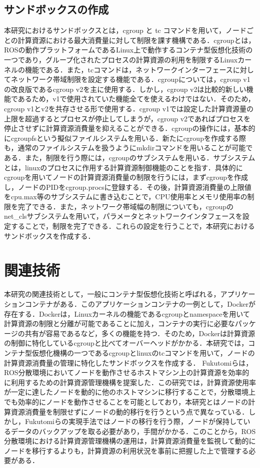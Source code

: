 \documentclass[11pt]{ujarticle} %
\begin{document}
\subsection{サンドボックスの作成}
本研究におけるサンドボックスとは，cgroup と tc コマンドを用いて，ノードごとの計算資源における最大消費量に対して制限を課す機構である．cgroupとは，ROSの動作プラットフォームであるLinux上で動作するコンテナ型仮想化技術の一つであり，グループ化されたプロセスの計算資源の利用を制限するLinuxカーネルの機能である．また，tcコマンドは，ネットワークインターフェースに対してネットワーク帯域制限を設定する機能である．cgroupについては，cgroup v1の改良版であるcgroup v2を主に使用する．しかし，cgroup v2は比較的新しい機能であるため，v1で使用されていた機能全てを使えるわけではない．そのため，cgroup v1とv2を共存させる形で使用する．cgroup v1では設定した計算資源量の上限を超過するとプロセスが停止してしまうが，cgroup v2であればプロセスを停止させずに計算資源消費量を抑えることができる．cgroupの操作には，基本的にcgroupfsという擬似ファイルシステムを用いる．新たにcgroupを作成する際も，通常のファイルシステムを扱うようにmkdirコマンドを用いることが可能である．また，制限を行う際には，cgroupのサブシステムを用いる．サブシステムとは，linuxのプロセスに作用する計算資源制御機能のことを指す．具体的にcgroupを用いてノードの計算資源消費量の制限を行うには，まずcgroupを作成し，ノードのPIDをcgroup.procsに登録する．その後，計算資源消費量の上限値をcpu.max等のサブシステムに書き込むことで，CPU使用率とメモリ使用率の制限を完了できる．また，ネットワーク帯域幅の制限についても，cgroupのnet\_clsサブシステムを用いて，パラメータとネットワークインタフェースを設定することで，制限を完了できる．これらの設定を行うことで，本研究におけるサンドボックスを作成する．

\section{関連技術}
本研究の関連技術として，一般にコンテナ型仮想化技術と呼ばれる，アプリケーションコンテナがある．このアプリケーションコンテナの一例として，Docker\cite{Docker}が存在する．Dockerは，Linuxカーネルの機能であるcgroupとnamespaceを用いて計算資源の制限と分離が可能であることに加え，コンテナの実行に必要なパッケージの共有が容易であるなど，多くの機能を持つ．そのため，Dockerは計算資源の制御に特化しているcgroupと比べてオーバーヘッドがかかる．本研究では，コンテナ型仮想化機構の一つであるcgroupとlinuxのtcコマンドを用いて，ノードの計算資源消費量の管理に特化したサンドボックスを作成する．
Fukutomiらは，ROS分散環境においてノードを動作させるホストマシン上の計算資源を効率的に利用するための計算資源管理機構を提案した\cite{ResourceManeger}．この研究では，計算資源使用率が一定に達したノードを動的に他のホストマシンに移行することで，分散環境上でも効率的にノードを動作させることを可能としており，本研究とはノードの計算資源消費量を制限せずにノードの動的移行を行うという点で異なっている．しかし，Fukutomiらの実現手法ではノードの移行を行う際，ノードが保持しているデータのバックアップを取る必要があり，手間がかかる．このことから，ROS分散環境における計算資源管理機構の運用は，計算資源消費量を監視して動的にノードを移行するよりも，計算資源の利用状況を事前に把握した上で管理する必要がある．
\end{document}

